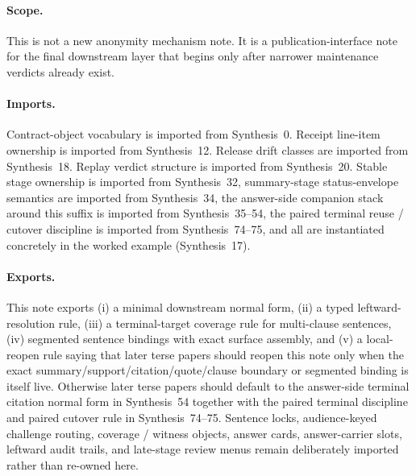 \documentclass[11pt]{article}
\begin{document}
\paragraph{Scope.}
This is not a new anonymity mechanism note.
It is a publication-interface note for the final downstream layer that begins only after narrower maintenance verdicts already exist.

\paragraph{Imports.}
Contract-object vocabulary is imported from Synthesis~0.\cite{series:contractobjects}
Receipt line-item ownership is imported from Synthesis~12.\cite{series:receiptitems}
Release drift classes are imported from Synthesis~18.\cite{series:planstateequiv}
Replay verdict structure is imported from Synthesis~20.\cite{series:auditorreplay}
Stable stage ownership is imported from Synthesis~32, summary-stage status-envelope semantics are imported from Synthesis~34, the answer-side companion stack around this suffix is imported from Synthesis~35--54, the paired terminal reuse / cutover discipline is imported from Synthesis~74--75, and all are instantiated concretely in the worked example (Synthesis~17).\cite{series:releasespine,series:statusenvelopes,series:sentencelocks,series:challengeroutes,series:challengestops,series:challengebranches,series:challengecoverage,series:challengesurfacehooks,series:challengeterminalwitnesses,series:challengecoveragewitnesspacks,series:challengecoveragewitnessslices,series:challengecoveragewitnesscores,series:challengeanswercapsules,series:challengeanswersheets,series:challengeanswercards,series:challengeanswercarrierslots,series:challengeansweraudittrails,series:challengeanswercitationdockets,series:challengeanswerpublicationprofiles,series:challengeanswerdisclosurepackets,series:challengeanswerescalationladders,series:challengeanswerreviewmenus,series:pairedterminalcitationdiscipline,series:pairedterminalcutoverrules,series:workedexample}

\paragraph{Exports.}
This note exports (i) a minimal downstream normal form, (ii) a typed leftward-resolution rule, (iii) a terminal-target coverage rule for multi-clause sentences, (iv) segmented sentence bindings with exact surface assembly, and (v) a local-reopen rule saying that later terse papers should reopen this note only when the exact summary/support/citation/quote/clause boundary or segmented binding is itself live. Otherwise later terse papers should default to the answer-side terminal citation normal form in Synthesis~54 together with the paired terminal discipline and paired cutover rule in Synthesis~74--75. Sentence locks, audience-keyed challenge routing, coverage / witness objects, answer cards, answer-carrier slots, leftward audit trails, and late-stage review menus remain deliberately imported rather than re-owned here.\cite{series:challengeanswerreviewmenus,series:pairedterminalcitationdiscipline,series:pairedterminalcutoverrules}
\end{document}
